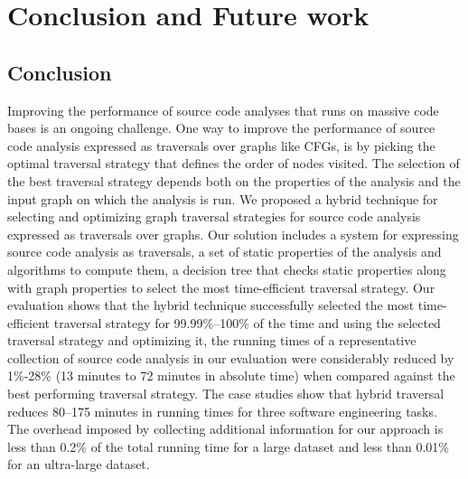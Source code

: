 \chapter{Conclusion and Future work}
\label{conclusion}
\section{Conclusion}
Improving the performance of source code analyses that runs on massive code bases
is an ongoing challenge. One way to improve the performance of
source code analysis expressed as traversals over graphs like CFGs, is by picking
the optimal traversal strategy that defines the order of nodes visited. The
selection of the best traversal strategy depends both on the properties of the
analysis and the input graph on which the analysis is run.
We proposed a hybrid technique for selecting and optimizing graph traversal
strategies for source code analysis expressed as traversals over graphs. Our
solution includes a system for expressing source code analysis as traversals, a set
of static properties of the analysis and algorithms to compute them, a decision
tree that checks static properties along with graph properties to select the
most time-efficient traversal strategy.
Our evaluation shows that the hybrid technique successfully selected the most
time-efficient traversal strategy for 99.99\%--100\% of the time and 
using the selected traversal strategy and optimizing it, the running times of a
representative collection of source code analysis in our evaluation
were considerably reduced by 1\%-28\% (13 minutes to 72 minutes in absolute time) when compared against the best performing traversal strategy. The case studies show that hybrid traversal reduces 80--175 minutes in running times for three software engineering tasks. The overhead imposed by 
collecting additional information for our approach is less than 0.2\% of 
the total running time for a large dataset and less than 0.01\% for an 
ultra-large dataset.\newline
